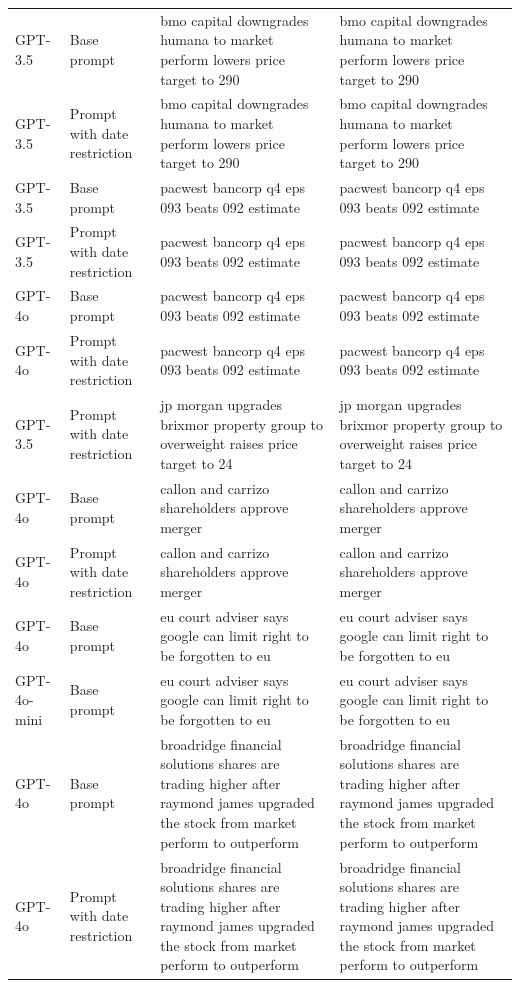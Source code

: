 \begin{longtable}{>{\raggedright\arraybackslash}p{1.4cm}>{\raggedright\arraybackslash}p{1.4cm}>{\raggedright\arraybackslash}p{5.5cm}>{\raggedright\arraybackslash}p{5.5cm}}
GPT-3.5 & Base prompt & bmo capital downgrades humana to market perform lowers price target to 290 & bmo capital downgrades humana to market perform lowers price target to 290\\
GPT-3.5 & Prompt with date restriction & bmo capital downgrades humana to market perform lowers price target to 290 & bmo capital downgrades humana to market perform lowers price target to 290\\
GPT-3.5 & Base prompt & pacwest bancorp q4 eps 093 beats 092 estimate & pacwest bancorp q4 eps 093 beats 092 estimate\\
GPT-3.5 & Prompt with date restriction & pacwest bancorp q4 eps 093 beats 092 estimate & pacwest bancorp q4 eps 093 beats 092 estimate\\
GPT-4o & Base prompt & pacwest bancorp q4 eps 093 beats 092 estimate & pacwest bancorp q4 eps 093 beats 092 estimate\\
GPT-4o & Prompt with date restriction & pacwest bancorp q4 eps 093 beats 092 estimate & pacwest bancorp q4 eps 093 beats 092 estimate\\
GPT-3.5 & Prompt with date restriction & jp morgan upgrades brixmor property group to overweight raises price target to 24 & jp morgan upgrades brixmor property group to overweight raises price target to 24\\
GPT-4o & Base prompt & callon and carrizo shareholders approve merger & callon and carrizo shareholders approve merger\\
GPT-4o & Prompt with date restriction & callon and carrizo shareholders approve merger & callon and carrizo shareholders approve merger\\
GPT-4o & Base prompt & eu court adviser says google can limit right to be forgotten to eu & eu court adviser says google can limit right to be forgotten to eu\\
GPT-4o-mini & Base prompt & eu court adviser says google can limit right to be forgotten to eu & eu court adviser says google can limit right to be forgotten to eu\\
GPT-4o & Base prompt & broadridge financial solutions shares are trading higher after raymond james upgraded the stock from market perform to outperform & broadridge financial solutions shares are trading higher after raymond james upgraded the stock from market perform to outperform\\
GPT-4o & Prompt with date restriction & broadridge financial solutions shares are trading higher after raymond james upgraded the stock from market perform to outperform & broadridge financial solutions shares are trading higher after raymond james upgraded the stock from market perform to outperform\\

\end{longtable}
